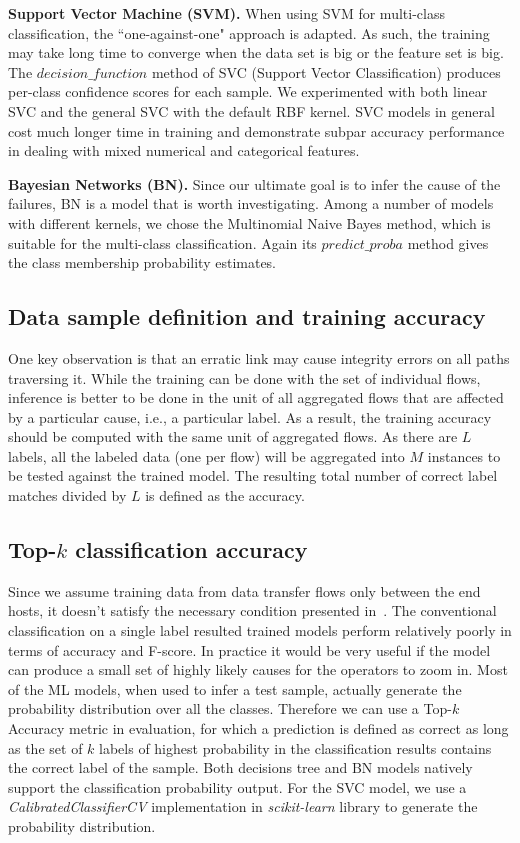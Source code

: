 {\bf Support Vector Machine (SVM).} When using SVM for multi-class classification, the ``one-against-one" approach is adapted. As such, the training may take long time to converge when the data set is big or the feature set is big. The $decision\_function$ method of SVC (Support Vector Classification) produces per-class confidence scores for each sample. We experimented with both linear SVC and the general SVC with the default RBF kernel. SVC models in general cost much longer time in training and demonstrate subpar accuracy performance in dealing with mixed numerical and categorical features.  

{\bf Bayesian Networks (BN).} Since our ultimate goal is to infer the cause of the failures, BN is a model that is worth investigating. Among a number of models with different kernels, we chose the Multinomial Naive Bayes method, which is suitable for the multi-class classification. Again its $predict\_proba$ method gives the class membership probability estimates.

\subsection{Data sample definition and training accuracy}
One key observation is that an erratic link may cause integrity errors on all paths traversing it. While the training can be done with the set of individual flows, inference is better to be done in the unit of all aggregated flows that are affected by a particular cause, i.e., a particular label. As a result, the training accuracy should be computed with the same unit of aggregated flows. As there are $L$ labels, all the labeled data (one per flow) will be aggregated into $M$ instances to be tested against the trained model. The resulting total number of correct label matches divided by $L$ is defined as the accuracy.

\subsection{Top-$k$ classification accuracy} 
Since we assume training data from data transfer flows only between the end hosts, it doesn't satisfy the necessary condition presented in~\cite{netbouncer:nsdi18}. The conventional classification on a single label resulted trained models perform relatively poorly in terms of accuracy and F-score. In practice it would be very useful if the model can produce a small set of highly likely causes for the operators to zoom in. Most of the ML models, when used to infer a test sample, actually generate the probability distribution over all the classes. Therefore we can use a Top-$k$ Accuracy metric in evaluation, for which a prediction is defined as correct as long as the set of $k$ labels of highest probability in the classification results contains the correct label of the sample. Both decisions tree and BN models natively support the classification probability output. For the SVC model, we use a \emph{CalibratedClassifierCV} implementation in {\it scikit-learn} library to generate the probability distribution.

